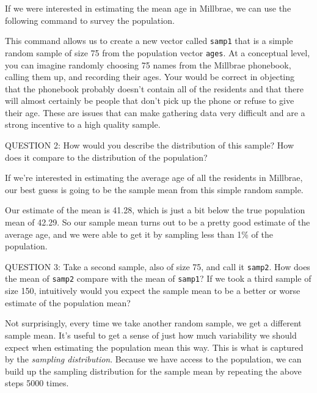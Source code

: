 \documentclass[11pt]{article}
\begin{document}
If we were interested in estimating the mean age in Millbrae, we can use the following command to survey the population.


This command allows us to create a new vector called \texttt{samp1} that is a simple random sample of size 75 from the population vector \texttt{ages}.  At a conceptual level, you can imagine randomly choosing 75 names from the Millbrae  phonebook, calling them up, and recording their ages.  Your would be correct in objecting that the phonebook probably doesn't contain all of the residents and that there will almost certainly be people that don't pick up the phone or refuse to give their age.  These are issues that can make gathering data very difficult and are a strong incentive to a high quality sample.

QUESTION 2: How would you describe the distribution of this sample?   How does it compare to the distribution of the population?

If we're interested in estimating the average age of all the residents in Millbrae, our best guess is going to be the sample mean from this simple random sample.


Our estimate of the mean is 41.28, which is just a bit below the true population mean of 42.29.  So our sample mean turns out to be a pretty good estimate of the average age, and we were able to get it by sampling less than 1\% of the population.

\bigskip
QUESTION 3: Take a second sample, also of size 75, and call it \texttt{samp2}.  How does the mean of \texttt{samp2} compare with the mean of \texttt{samp1}?  If we took a third sample of size 150, intuitively would you expect the sample mean to be a better or worse estimate of the population mean?

Not surprisingly, every time we take another random sample, we get a different sample mean.  It's useful to get a sense of just how much variability we should expect when estimating the population mean this way.  This is what is captured by the \emph{sampling distribution}.  Because we have access to the population, we can build up the sampling distribution for the sample mean by repeating the above steps 5000 times.

\end{document}
